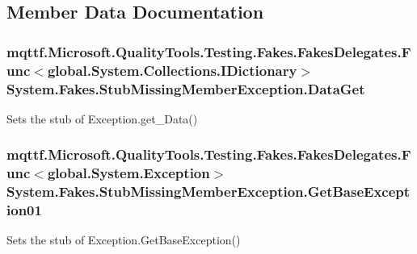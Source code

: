\subsection{Member Data Documentation}
\hypertarget{class_system_1_1_fakes_1_1_stub_missing_member_exception_a96c3a82d1fbd61fb30aeb3651df48eba}{
\subsubsection[{Data\-Get}]{\setlength{\rightskip}{0pt plus 5cm}mqttf.\-Microsoft.\-Quality\-Tools.\-Testing.\-Fakes.\-Fakes\-Delegates.\-Func$<$global.\-System.\-Collections.\-I\-Dictionary$>$ System.\-Fakes.\-Stub\-Missing\-Member\-Exception.\-Data\-Get}}\label{class_system_1_1_fakes_1_1_stub_missing_member_exception_a96c3a82d1fbd61fb30aeb3651df48eba}


Sets the stub of Exception.\-get\-\_\-\-Data()

\hypertarget{class_system_1_1_fakes_1_1_stub_missing_member_exception_a3c42fcb9a6f1d17b2edce1ac8bda5c55}{
\subsubsection[{Get\-Base\-Exception01}]{\setlength{\rightskip}{0pt plus 5cm}mqttf.\-Microsoft.\-Quality\-Tools.\-Testing.\-Fakes.\-Fakes\-Delegates.\-Func$<$global.\-System.\-Exception$>$ System.\-Fakes.\-Stub\-Missing\-Member\-Exception.\-Get\-Base\-Exception01}}\label{class_system_1_1_fakes_1_1_stub_missing_member_exception_a3c42fcb9a6f1d17b2edce1ac8bda5c55}


Sets the stub of Exception.\-Get\-Base\-Exception()

